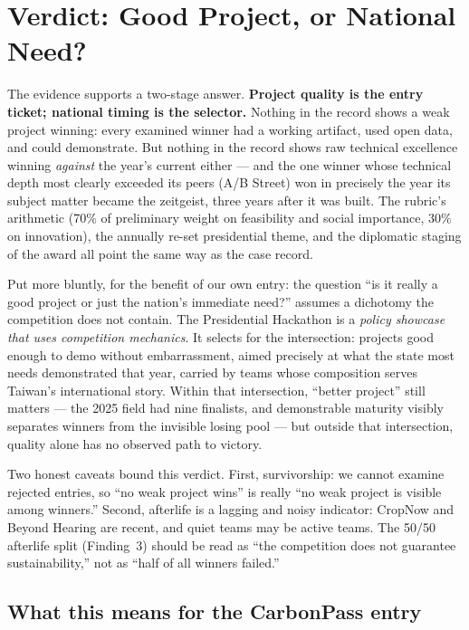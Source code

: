 \section{Verdict: Good Project, or National Need?}\label{sec:verdict}

\begin{finding}{The evidence supports a two-stage answer.}
\textbf{Project quality is the entry ticket; national timing is the selector.}
Nothing in the record shows a weak project winning: every examined winner had
a working artifact, used open data, and could demonstrate. But nothing in the
record shows raw technical excellence winning \emph{against} the year's
current either --- and the one winner whose technical depth most clearly
exceeded its peers (A/B Street) won in precisely the year its subject matter
became the zeitgeist, three years after it was built. The rubric's arithmetic
(70\% of preliminary weight on feasibility and social importance, 30\% on
innovation\cite{handbook}), the annually re-set presidential theme, and the
diplomatic staging of the award all point the same way as the case record.
\end{finding}

Put more bluntly, for the benefit of our own entry: the question ``is it
really a good project or just the nation's immediate need?'' assumes a
dichotomy the competition does not contain. The Presidential Hackathon is a
\emph{policy showcase that uses competition mechanics}. It selects for the
intersection: projects good enough to demo without embarrassment, aimed
precisely at what the state most needs demonstrated that year, carried by
teams whose composition serves Taiwan's international story. Within that
intersection, ``better project'' still matters --- the 2025 field had nine
finalists\cite{focuscrop}, and demonstrable maturity visibly separates winners
from the invisible losing pool --- but outside that intersection, quality
alone has no observed path to victory.

Two honest caveats bound this verdict. First, survivorship: we cannot examine
rejected entries, so ``no weak project wins'' is really ``no weak project is
visible among winners.'' Second, afterlife is a lagging and noisy indicator:
CropNow and Beyond Hearing are recent, and quiet teams may be active teams.
The 50/50 afterlife split (Finding~3) should be read as ``the competition does
not guarantee sustainability,'' not as ``half of all winners failed.''

\subsection{What this means for the CarbonPass entry}

